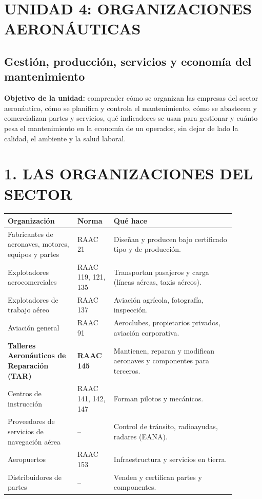 \clearpage
\section*{UNIDAD 4: ORGANIZACIONES AERONÁUTICAS}
\subsection*{Gestión, producción, servicios y economía del mantenimiento}

\begin{recuadro}
\textbf{Objetivo de la unidad:} comprender cómo se organizan las empresas del sector aeronáutico,
cómo se planifica y controla el mantenimiento, cómo se abastecen y comercializan partes y
servicios, qué indicadores se usan para gestionar y cuánto pesa el mantenimiento en la economía
de un operador, sin dejar de lado la calidad, el ambiente y la salud laboral.
\end{recuadro}

\section*{1. LAS ORGANIZACIONES DEL SECTOR}

\begin{center}
\small
\begin{tabular}{|p{0.27\linewidth}|p{0.14\linewidth}|p{0.47\linewidth}|}
\hline
\textbf{Organización} & \textbf{Norma} & \textbf{Qué hace} \\ \hline
Fabricantes de aeronaves, motores, equipos y partes & RAAC 21 & Diseñan y producen bajo
certificado tipo y de producción. \\ \hline
Explotadores aerocomerciales & RAAC 119, 121, 135 & Transportan pasajeros y carga (líneas
aéreas, taxis aéreos). \\ \hline
Explotadores de trabajo aéreo & RAAC 137 & Aviación agrícola, fotografía, inspección. \\ \hline
Aviación general & RAAC 91 & Aeroclubes, propietarios privados, aviación corporativa. \\ \hline
\textbf{Talleres Aeronáuticos de Reparación (TAR)} & \textbf{RAAC 145} & Mantienen, reparan y
modifican aeronaves y componentes para terceros. \\ \hline
Centros de instrucción & RAAC 141, 142, 147 & Forman pilotos y mecánicos. \\ \hline
Proveedores de servicios de navegación aérea & -- & Control de tránsito, radioayudas, radares
(EANA). \\ \hline
Aeropuertos & RAAC 153 & Infraestructura y servicios en tierra. \\ \hline
Distribuidores de partes & -- & Venden y certifican partes y componentes. \\ \hline
\end{tabular}
\end{center}


